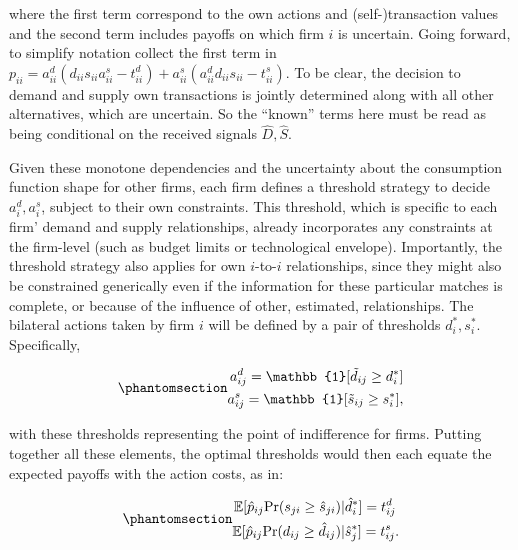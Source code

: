 \documentclass[
]{article}
\theoremstyle{plain}
\theoremstyle{definition}
\theoremstyle{remark}
\begin{document}
where the first term correspond to the own actions and
(self-)transaction values and the second term includes payoffs on which
firm \(i\) is uncertain. Going forward, to simplify notation collect the
first term in
\(p_{ii} = a_{ii}^d (d_{ii} s_{ii} a_{ii}^s - t_{ii}^d) + a_{ii}^s (a_{ii}^d d_{ii} s_{ii} - t_{ii}^s)\).
To be clear, the decision to demand and supply own transactions is
jointly determined along with all other alternatives, which are
uncertain. So the ``known'' terms here must be read as being conditional
on the received signals \(\hat{D}, \hat{S}\).

Given these monotone dependencies and the uncertainty about the
consumption function shape for other firms, each firm defines a
threshold strategy to decide \(a_{i}^d, a_{i}^s\), subject to their own
constraints. This threshold, which is specific to each firm' demand and
supply relationships, already incorporates any constraints at the
firm-level (such as budget limits or technological envelope).
Importantly, the threshold strategy also applies for own \(i\)-to-\(i\)
relationships, since they might also be constrained generically even if
the information for these particular matches is complete, or because of
the influence of other, estimated, relationships. The bilateral actions
taken by firm \(i\) will be defined by a pair of thresholds
\(d_{i}^*, s_{i}^*\). Specifically,

\begin{equation}\phantomsection\label{eq-thresholds}{
\begin{split}
a_{ij}^d = \mathbb{1}[\tilde{d}_{ij} \geq d_{i}^*] \\
a_{ij}^s = \mathbb{1}[\tilde{s}_{ij} \geq s_{i}^*],
\end{split}
}\end{equation}

with these thresholds representing the point of indifference for firms.
Putting together all these elements, the optimal thresholds would then
each equate the expected payoffs with the action costs, as in:

\begin{equation}\phantomsection\label{eq-indif}{
\begin{split}
\mathbb{E}[\hat{p}_{ij} \text{Pr}(s_{ji} \geq \hat{s}_{ji}) &| \hat{d}_{i}^*] = t_{ij}^d \\
\mathbb{E}[\hat{p}_{ij} \text{Pr}(d_{ij} \geq \hat{d}_{ij}) &| \hat{s}_{j}^*] = t_{ij}^s.
\end{split}
}\end{equation}
\end{document}
